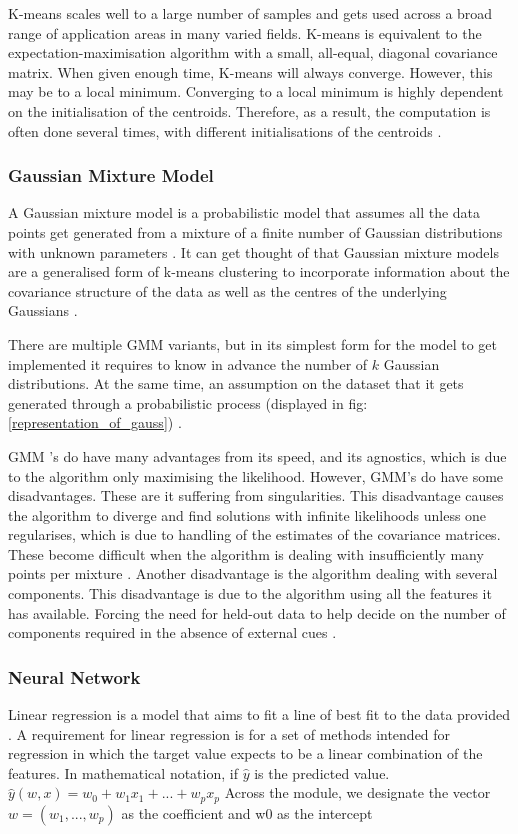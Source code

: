 	K-means scales well to a large number of samples and gets used across a broad range of application areas in many varied fields. K-means is equivalent to the expectation-maximisation algorithm with a small, all-equal, diagonal covariance matrix. When given enough time, K-means will always converge. However, this may be to a local minimum. Converging to a local minimum is highly dependent on the initialisation of the centroids. Therefore, as a result, the computation is often done several times, with different initialisations of the centroids \cite{sklearn_km}.
	
	\subsubsection{Gaussian Mixture Model}
	A Gaussian mixture model is a probabilistic model that assumes all the data points get generated from a mixture of a finite number of Gaussian distributions with unknown parameters \cite{geron2019hands, sklearn_gmm}. It can get thought of that Gaussian mixture models are a generalised form of k-means clustering to incorporate information about the covariance structure of the data as well as the centres of the underlying Gaussians \cite{sklearn_gmm}. 
	
	There are multiple GMM variants, but in its simplest form for the model to get implemented it requires to know in advance the number of $k$ Gaussian distributions. At the same time, an assumption on the dataset that it gets generated through a probabilistic process (displayed in fig:\ref{representation_of_gauss}) \cite{geron2019hands}. 
	
	GMM 's do have many advantages from its speed, and its agnostics, which is due to the algorithm only maximising the likelihood. However, GMM's do have some disadvantages. These are it suffering from singularities. This disadvantage causes the algorithm to diverge and find solutions with infinite likelihoods unless one regularises, which is due to handling of the estimates of the covariance matrices. These become difficult when the algorithm is dealing with insufficiently many points per mixture \cite{sklearn_gmm}. Another disadvantage is the algorithm dealing with several components. This disadvantage is due to the algorithm using all the features it has available. Forcing the need for held-out data to help decide on the number of components required in the absence of external cues \cite{sklearn_gmm}.
	
	\subsubsection{Neural Network}
	Linear regression is a model that aims to fit a line of best fit to the data provided \cite{geron2019hands, sklearn_lr}.  A requirement for linear regression is for a set of methods intended for regression in which the target value expects to be a linear combination of the features. In mathematical notation, if $\hat{y}$ is the predicted value. $\hat{y}(w,x)=w_0+w_1x_1+...+w_px_p$
	Across the module, we designate the vector $w=(w_1,...,w_p)$ as the coefficient and w0 as the intercept \cite{sklearn_lr}
	
